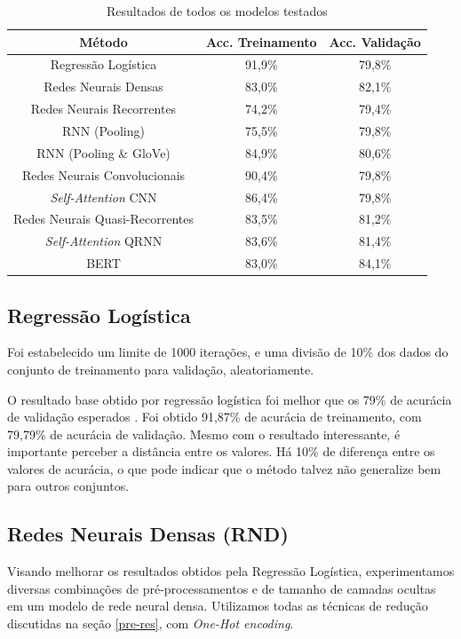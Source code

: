 \documentclass[twoside,conference,a4paper]{IEEEtran}
\begin{document}
\begin{table}[ht]
\renewcommand{\arraystretch}{1.3}
    \centering
    \caption{Resultados de todos os modelos testados}
    \begin{tabular}{c|c|c}
         Método & Acc. Treinamento & Acc. Validação \\
         \hline
         Regressão Logística & 91,9\% & 79,8\%  \\
         Redes Neurais Densas & 83,0\% & 82,1\% \\
         Redes Neurais Recorrentes & 74,2\% & 79,4\% \\
         RNN (Pooling) & 75,5\% & 79,8\% \\
         RNN (Pooling \& GloVe) & 84,9\% & 80,6\% \\
         Redes Neurais Convolucionais & 90,4\% & 79,8\% \\
         \textit{Self-Attention} CNN & 86,4\% & 79,8\%\\
         Redes Neurais Quasi-Recorrentes & 83,5\% & 81,2\% \\
         \textit{Self-Attention} QRNN & 83,6\% & 81,4\%\\
         BERT & 83,0\% & 84,1\% \\
    \end{tabular}
    \label{tab:results}
\end{table}

\subsection{Regressão Logística}
Foi estabelecido um limite de 1000 iterações, e uma divisão de 10\% dos dados do conjunto de treinamento para validação, aleatoriamente.

O resultado base obtido por regressão logística foi melhor que os 79\% de acurácia de validação esperados \cite{reg_log}. Foi obtido 91,87\% de acurácia de treinamento, com 79,79\% de acurácia de validação. Mesmo com o resultado interessante, é importante perceber a distância entre os valores. Há 10\% de diferença entre os valores de acurácia, o que pode indicar que o método talvez não generalize bem para outros conjuntos.

\subsection{Redes Neurais Densas (RND)}

Visando melhorar os resultados obtidos pela Regressão Logística, experimentamos diversas combinações de pré-processamentos e de tamanho de camadas ocultas em um modelo de rede neural densa. Utilizamos todas as técnicas de redução discutidas na seção \ref{pre-res}, com \textit{One-Hot encoding}. 
\end{document}
